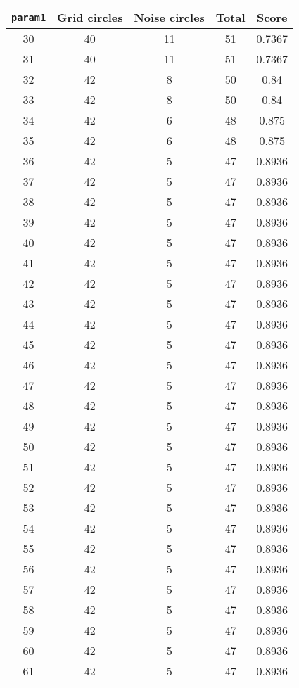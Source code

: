 \documentclass[letterpaper, 12pt]{article}
\begin{document}
\begin{longtable}{|c|c|c|c|c|}
\hline
\textbf{\texttt{param1}} & \textbf{Grid circles} & \textbf{Noise circles} & \textbf{Total} & \textbf{Score} \\
\hline
30 & 40 & 11 & 51 & 0.7367 \\
\hline
31 & 40 & 11 & 51 & 0.7367 \\
\hline
32 & 42 & 8 & 50 & 0.84 \\
\hline
33 & 42 & 8 & 50 & 0.84 \\
\hline
34 & 42 & 6 & 48 & 0.875 \\
\hline
35 & 42 & 6 & 48 & 0.875 \\
\hline
36 & 42 & 5 & 47 & 0.8936 \\
\hline
37 & 42 & 5 & 47 & 0.8936 \\
\hline
38 & 42 & 5 & 47 & 0.8936 \\
\hline
39 & 42 & 5 & 47 & 0.8936 \\
\hline
40 & 42 & 5 & 47 & 0.8936 \\
\hline
41 & 42 & 5 & 47 & 0.8936 \\
\hline
42 & 42 & 5 & 47 & 0.8936 \\
\hline
43 & 42 & 5 & 47 & 0.8936 \\
\hline
44 & 42 & 5 & 47 & 0.8936 \\
\hline
45 & 42 & 5 & 47 & 0.8936 \\
\hline
46 & 42 & 5 & 47 & 0.8936 \\
\hline
47 & 42 & 5 & 47 & 0.8936 \\
\hline
48 & 42 & 5 & 47 & 0.8936 \\
\hline
49 & 42 & 5 & 47 & 0.8936 \\
\hline
50 & 42 & 5 & 47 & 0.8936 \\
\hline
51 & 42 & 5 & 47 & 0.8936 \\
\hline
52 & 42 & 5 & 47 & 0.8936 \\
\hline
53 & 42 & 5 & 47 & 0.8936 \\
\hline
54 & 42 & 5 & 47 & 0.8936 \\
\hline
55 & 42 & 5 & 47 & 0.8936 \\
\hline
56 & 42 & 5 & 47 & 0.8936 \\
\hline
57 & 42 & 5 & 47 & 0.8936 \\
\hline
58 & 42 & 5 & 47 & 0.8936 \\
\hline
59 & 42 & 5 & 47 & 0.8936 \\
\hline
60 & 42 & 5 & 47 & 0.8936 \\
\hline
61 & 42 & 5 & 47 & 0.8936 \\

\end{longtable}
\end{document}
